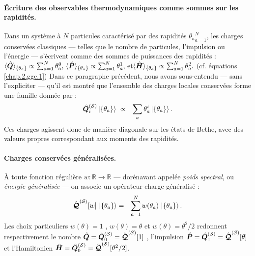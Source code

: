 \paragraph{Écriture des observables thermodynamiques comme sommes sur les rapidités.}

Dans un système à $N$ particules caractérisé par des rapidités ${ \theta_a }_{a = 1}^N$, les charges conservées classiques — telles que le nombre de particules, l’impulsion ou l’énergie — s’écrivent comme des sommes de puissances des rapidités :
\(
	\langle \hat{\bm{Q}} \rangle_{\{ \theta_a\} } \propto \sum_{a = 1}^N \theta_a^0 , \,  \langle \hat{\bm{P}} \rangle_{\{ \theta_a\} } \propto \sum_{a = 1}^N \theta_a^1  ,\,  \mbox{et} \langle \hat{\bm{H}} \rangle_{\{ \theta_a\} } \propto \sum_{a = 1}^N \theta_a^2 .	
\)
(cf. équations \eqref{chap.2.gge.1})
Dans ce paragraphe précédent, nous avons sous-entendu — sans l’expliciter — qu’il est montré que l’ensemble des charges locales conservées forme une famille donnée par :
\begin{eqnarray}
	\operator{Q}_i^{(\mathcal{S})} \ket{\{\theta_a\} } & \propto & \sum_a \theta_a^i \ket{\{\theta_a\} }.
\end{eqnarray}
Ces charges agissent donc de manière diagonale sur les états de Bethe, avec des valeurs propres correspondant aux moments des rapidités.
\paragraph{Charges conservées généralisées.\label{sec:charges-gen}}

À toute fonction régulière
\(
  w:\mathbb R\!\to\!\mathbb R
\)
–– dorénavant appelée \emph{poids spectral}, ou \emph{énergie généralisée} ––
on associe un opérateur-charge généralisé :
\begin{eqnarray}\label{chap.2.charge.1}
	\hat{\bm{\mathcal{Q}}}^{(\mathcal{S})}[w]\,\ket{\{\theta_a\} }&  = & \sum_{a=1}^{N}w(\theta_a)\,\ket{\{\theta_a\} } .	
\end{eqnarray}
Les choix particuliers
\(
  w(\theta)=1
\)
,
\(
  w(\theta)=\theta
\)
et
\(
  w(\theta)=\theta^{2}/2
\)
redonnent respectivement le nombre \(\hat{\bm{Q}}=\hat{\bm{Q}}_0^{(\mathcal{S})} = \hat{\bm{\mathcal{Q}}}^{(\mathcal{S})}[1]\) , l’impulsion \(\hat{\bm{P}}=\hat{\bm{Q}}_1^{(\mathcal{S})} = \hat{\bm{\mathcal{Q}}}^{(\mathcal{S})}[\theta]\) et l’Hamiltonien
\(\hat{\bm{H}}=\hat{\bm{Q}}_0^{(\mathcal{S})} = \hat{\bm{\mathcal{Q}}}^{(\mathcal{S})}[\theta^2/2]\).

